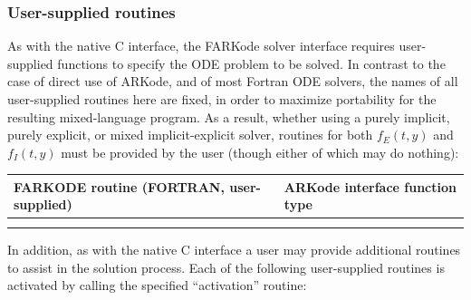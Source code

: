\documentclass[letterpaper,10pt,english]{sphinxmanual}
\begin{document}
\subsubsection{User-supplied routines}
\label{f_interface/Routines:finterface-usersupplied}\label{f_interface/Routines:user-supplied-routines}
As with the native C interface, the FARKode solver interface requires
user-supplied functions to specify the ODE problem to be solved.  In
contrast to the case of direct use of ARKode, and of most Fortran ODE
solvers, the names of all user-supplied routines here are fixed, in
order to maximize portability for the resulting mixed-language program.
As a result, whether using a purely implicit, purely explicit, or
mixed implicit-explicit solver, routines for both $f_E(t,y)$ and
$f_I(t,y)$ must be provided by the user (though either of which
may do nothing):

\begin{tabulary}{\linewidth}{|L|L|}
\hline
\textbf{\relax 
FARKODE routine
(FORTRAN, user-supplied)
} & \textbf{\relax 
ARKode interface
function type
}\\\hline

{\hyperref[f_interface/Usage:f/_/FARKIFUN]{}}
 & 
{\hyperref[c_interface/User_supplied:ARKRhsFn]{}}
\\\hline

{\hyperref[f_interface/Usage:f/_/FARKEFUN]{}}
 & 
{\hyperref[c_interface/User_supplied:ARKRhsFn]{}}
\\\hline
\end{tabulary}


In addition, as with the native C interface a user may provide
additional routines to assist in the solution process.  Each of the
following user-supplied routines is activated by calling the specified
``activation'' routine:
\end{document}
